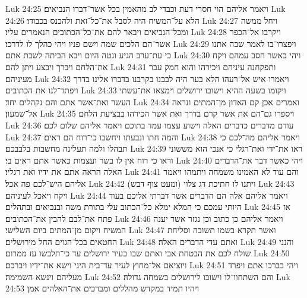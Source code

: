 Luk 24:25  ויאמר אליהם הוי חסרי דעת וכבדי לב מהאמין בכל אשר־דברו הנביאים׃
Luk 24:26  הלא על־המשיח היה לסבל את־כל־זאת ולהכנס בכבודו׃
Luk 24:27  ויחל ממשה ומכל־הנביאים ויבאר להם את־כל־הכתובים הנאמרים עליו׃
Luk 24:28  ויקרבו אל־הכפר אשר־הם הלכים שמה וישם פניו ויהי כהלך לו לדרכו׃
Luk 24:29  ויפצרו־בו לאמר שבה אתנו כי עת־ערב הגיע ונטה היום ויבא הביתה לשבת אתם׃
Luk 24:30  ויהי כאשר הסב עמהם ויקח את־הלחם ויברך ויבצע ויתן להם׃
Luk 24:31  ותפקחנה עיניהם ויכירהו והוא חמק עבר מעיניהם׃
Luk 24:32  ויאמרו איש אל־רעהו הלא בער היה לבבנו בקרבנו בדברו אלינו בדרך ויפתר־לנו את הכתובים׃
Luk 24:33  ויקומו בשעה ההיא וישובו ירושלים וימצאו את־עשתי העשר ואת־אשר אתם והם נקהלים יחד׃
Luk 24:34  ואמרים אכן קם האדון מן־המתים ונראה אל־שמעון׃
Luk 24:35  ויספרו גם־הם את אשר קרם בדרך ואת אשר הכירהו בבציעת הלחם׃
Luk 24:36  עודם מדברים כדברים האלה וישוע עצמו עמד בתוכם ויאמר אליהם שלום לכם׃
Luk 24:37  והמה חתו ונבעתו ויחשבו כי־רוח הם ראים׃
Luk 24:38  ויאמר אליהם מה־לכם כי תבהלו ולמה תעלינה מחשבות בלבבכם׃
Luk 24:39  ראו את־ידי ואת־רגלי כי אנכי הוא מששוני וראו כי רוח אין לו בשר ועצמות כאשר אתם ראים בי׃
Luk 24:40  ויהי כאשר דבר את־הדברים האלה הראה אתם את ידיו ואת רגליו׃
Luk 24:41  והם עוד לא האמינו משמחה ויתמהו ויאמר אליהם היש־לכם פה אכל׃
Luk 24:42  ויתנו לו חתיכת דג צלוי (ומעט צוף דבש)׃
Luk 24:43  ויקח ויאכל לעיניהם׃
Luk 24:44  ויאמר אליהם אלה הם הדברים אשר דברתי אליכם בעוד היותי עמכם כי המלא ימלא כל־הכתוב עלי בתורת משה ובנביאים ובתהלים׃
Luk 24:45  אז פתח את־לבם להבין את־הכתובים׃
Luk 24:46  ויאמר אליהם כן כתוב וכן נגזר אשר יענה המשיח ויקום מן־המתים ביום השלישי׃
Luk 24:47  ואשר תקרא בשמו תשובה וסליחת החטאים בכל־הגוים החל מירושלים׃
Luk 24:48  ואתם עדי הדברים האלה׃
Luk 24:49  והנני שולח לכם את הבטחת אבי ואתם שבו בעיר ירושלים עד כי־תלבשו עז ממרום׃
Luk 24:50  ויוציאם אל־מחוץ לעיר עד־בית היני וישא את־ידיו ויברכם׃
Luk 24:51  ויהי בברכו אתם ויפרד מעליהם וינשא השמימה׃
Luk 24:52  והם השתחוו־לו וישובו לירושלים בשמחה גדולה׃
Luk 24:53  ויהיו תמיד במקדש מהללים ומברכים את־האלהים אמן׃


